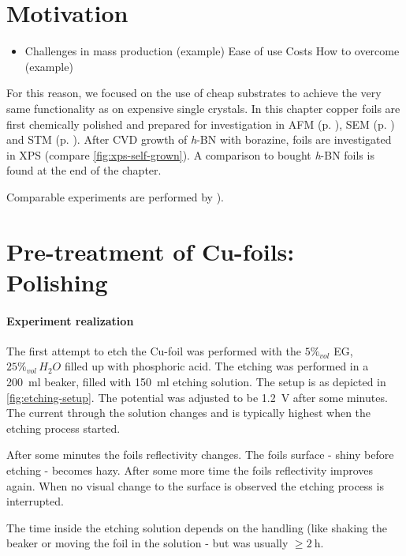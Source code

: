 \section{Motivation}
\begin{itemize}	
	\item Challenges in mass production (example)
	\subitem Ease of use
	\subitem Costs
	\subsubitem How to overcome (example)
\end{itemize}	

For this reason, we focused on the use of cheap substrates to achieve the very same functionality as on expensive single crystals. In this chapter copper foils are first chemically polished and prepared for investigation in AFM (p. \pageref{sec:foil-AFM}), SEM (p. \pageref{sec:foil-SEM}) and STM (p. \pageref{sec:foil-STM}). After CVD growth of \textit{h}-BN with borazine, foils are investigated in XPS (compare \autoref{fig:xps-self-grown}). A comparison to bought \textit{h}-BN foils is found at the end of the chapter.

Comparable experiments  are performed by \cite[8]{stables_report_2008}). 

	\section{Pre-treatment of Cu-foils: Polishing}
	
	\paragraph{Experiment realization}The first attempt to etch the Cu-foil was performed with the $5\%_{vol}$ EG, $25\%_{vol}\,H_2O$ filled up with phosphoric acid. The etching was performed in a \SI{200}{\ml} beaker, filled with \SI{150}{\ml} etching solution. The setup is as depicted in \autoref{fig:etching-setup}. The potential was adjusted to be \SI{1.2}{\V} after some minutes. The current through the solution changes and is typically highest when the etching process started. 
	
	After some minutes the foils reflectivity changes. The foils surface - shiny before etching - becomes hazy. After some more time the foils reflectivity improves again. When no visual change to the surface is observed the etching process is interrupted. 
	
	The time inside the etching solution depends on the handling (like shaking the beaker or moving the foil in the solution - but was usually $\geq \SI{2}{\hour}$.
	
